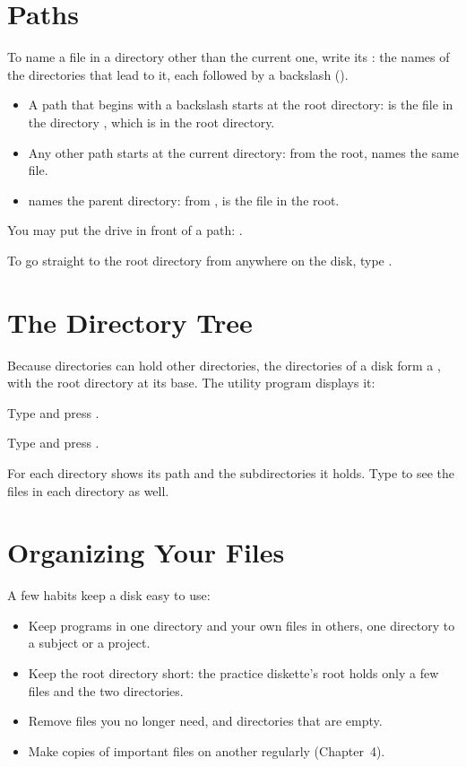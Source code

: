 
\section{Paths}
To name a file in a directory other than the current one, write its
: the names of the directories that lead to it, each followed by
a backslash (\type{\bs}).
\begin{itemize}
\item A path that begins with a backslash starts at the root directory:
   is the file  in the
  directory , which is in the root directory.
\item Any other path starts at the current directory: from the root,
   names the same file.
\item {} names the parent directory: from ,
   is the file  in the root.
\end{itemize}
You may put the drive in front of a path: .

To go straight to the root directory from anywhere on the disk, type
.

\section{The Directory Tree}
Because directories can hold other directories, the directories of a disk
form a , with the root directory at its base.  The 
utility program displays it:
\begin{Steps}
\item Type  and press .
\item Type  and press .
\end{Steps}


For each directory  shows its path and the subdirectories it
holds.  Type  to see the files in each directory as well.

\section{Organizing Your Files}
A few habits keep a disk easy to use:
\begin{itemize}
\item Keep programs in one directory and your own files in others, one
  directory to a subject or a project.
\item Keep the root directory short: the practice diskette's root holds
  only a few files and the two directories.
\item Remove files you no longer need, and directories that are empty.
\item Make copies of important files on another  regularly
  (Chapter~4).
\end{itemize}

